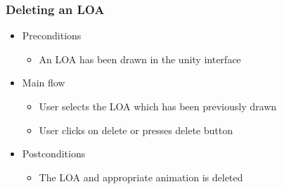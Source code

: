 \subsubsection{Deleting an LOA}
    \begin{itemize}
    \item Preconditions
        \begin{itemize}
            \item An LOA has been drawn in the unity interface
        \end{itemize}
    \end{itemize}
    \begin{itemize}
        \item Main flow
        \begin{itemize}
            \item User selects the LOA which has been previously drawn
            \item User clicks on delete or presses delete button
        \end{itemize}
    \end{itemize}
    \begin{itemize}
        \item Postconditions
        \begin{itemize}
            \item The LOA and appropriate animation is deleted
        \end{itemize}
    \end{itemize}

